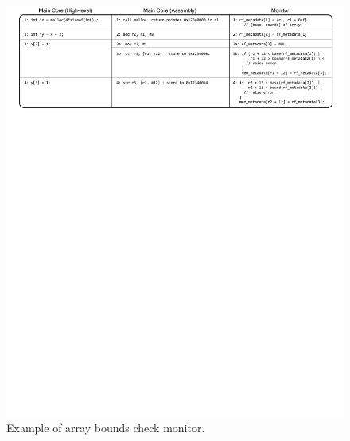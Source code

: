 \begin{figure}
  \begin{center}
    \includegraphics[]{figs/monitoring_wcet/example_full.pdf}
    \caption{Example of array bounds check monitor.}
    \label{fig:dropping.example_full}
    \vspace{-0.2in}
  \end{center}
\end{figure} 

